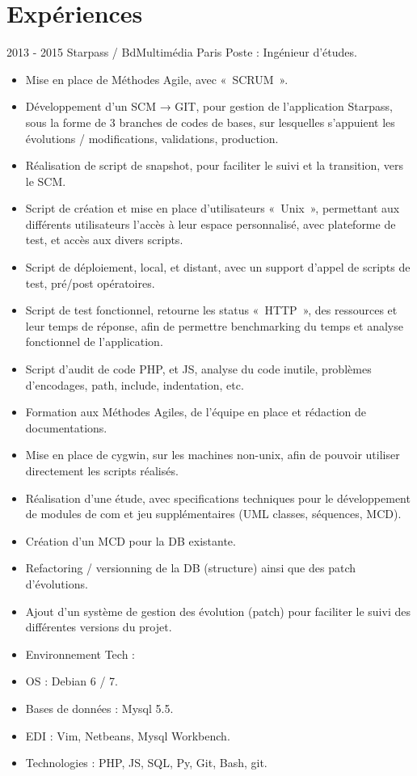 \documentclass[print]{GuillaumeSeren-cv}
\begin{document}
\section{Expériences}
\begin{entrylist}
  \entryBul
  {2013 - 2015}
  {Starpass / BdMultimédia}
  {Paris}
  {Poste : Ingénieur d'études.}
  {
     \begin{itemize}[leftmargin=*]
       \setlength\itemsep{0pt}
        \item Mise en place de Méthodes Agile, avec « SCRUM ».
        \item Développement d'un SCM → GIT, pour gestion de l'application Starpass, sous la forme de 3 branches de codes de bases, sur lesquelles s'appuient les évolutions / modifications, validations, production.
        \item Réalisation de script de snapshot, pour faciliter le suivi et la transition, vers le SCM.
        \item Script de création et mise en place d'utilisateurs « Unix », permettant aux différents utilisateurs l'accès à leur espace personnalisé, avec plateforme de test, et accès aux divers scripts.
        \item Script de déploiement, local, et distant, avec un support d'appel de scripts de test, pré/post opératoires.
        \item Script de test fonctionnel, retourne les status « HTTP », des ressources et leur temps de réponse, afin de permettre benchmarking du temps et analyse fonctionnel de l'application.
        \item Script d'audit de code PHP, et JS, analyse du code inutile, problèmes d'encodages, path, include, indentation, etc.
        \item Formation aux Méthodes Agiles, de l'équipe en place et rédaction de documentations.
        \item Mise en place de cygwin, sur les machines non-unix, afin de pouvoir utiliser directement les scripts réalisés.
        \item Réalisation d'une étude, avec specifications techniques pour le développement de modules de com et jeu supplémentaires (UML classes, séquences, MCD).
        \item Création d'un MCD pour la DB existante.
        \item Refactoring / versionning de la DB (structure) ainsi que des patch d'évolutions.
        \item Ajout d'un système de gestion des évolution (patch) pour faciliter le suivi des différentes versions du projet.
        \item Environnement Tech :
        \item OS : Debian 6 / 7.
        \item Bases de données : Mysql 5.5.
        \item EDI : Vim, Netbeans, Mysql Workbench.
        \item Technologies : PHP, JS, SQL, Py, Git, Bash, git.
     \end{itemize}
  }


\end{entrylist}
\end{document}
